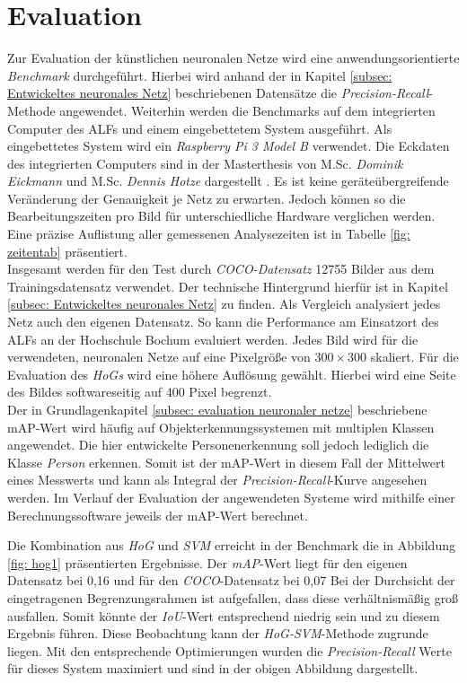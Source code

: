 \chapter{Evaluation}
\label{ch: Verifikation}
Zur Evaluation der künstlichen neuronalen Netze wird eine anwendungsorientierte \textit{Benchmark} durchgeführt. Hierbei wird anhand der in Kapitel \ref{subsec: Entwickeltes neuronales Netz} beschriebenen Datensätze die \textit{Precision-Recall}-Methode angewendet. Weiterhin werden die Benchmarks auf dem integrierten Computer des ALFs und einem eingebettetem System ausgeführt. Als eingebettetes System wird ein \textit{Raspberry Pi 3 Model B} verwendet. Die Eckdaten des integrierten Computers sind in der Masterthesis von M.Sc. \textit{Dominik Eickmann} und M.Sc. \textit{Dennis Hotze} dargestellt \cite{alf}. Es ist keine geräteübergreifende Veränderung der Genauigkeit je Netz zu erwarten. Jedoch können so die Bearbeitungszeiten pro Bild für unterschiedliche Hardware verglichen werden. Eine präzise Auflistung aller gemessenen Analysezeiten ist in Tabelle \ref{fig: zeitentab} präsentiert. \\

Insgesamt werden für den Test durch \textit{COCO-Datensatz} 12755 Bilder aus dem Trainingsdatensatz verwendet. Der technische Hintergrund hierfür ist in Kapitel \ref{subsec: Entwickeltes neuronales Netz} zu finden. Als Vergleich analysiert jedes Netz auch den eigenen Datensatz. So kann die Performance am Einsatzort des ALFs an der Hochschule Bochum evaluiert werden. Jedes Bild wird für die verwendeten, neuronalen Netze auf eine Pixelgröße von $300 \times 300$ skaliert. Für die Evaluation des \textit{HoGs} wird eine höhere Auflösung gewählt. Hierbei wird eine Seite des Bildes softwareseitig auf 400 Pixel begrenzt. \\

Der in Grundlagenkapitel \ref{subsec: evaluation neuronaler netze} beschriebene mAP-Wert wird häufig auf Objekterkennungssystemen mit multiplen Klassen angewendet. Die hier entwickelte Personenerkennung soll jedoch lediglich die Klasse \textit{Person} erkennen. Somit ist der mAP-Wert in diesem Fall der Mittelwert eines Messwerts und kann als Integral der \textit{Precision-Recall}-Kurve angesehen werden. Im Verlauf der Evaluation der angewendeten Systeme wird mithilfe einer Berechnungssoftware jeweils der mAP-Wert berechnet.
 


Die Kombination aus \textit{HoG} und \textit{SVM} erreicht in der Benchmark die in Abbildung \ref{fig: hog1} präsentierten Ergebnisse. Der \textit{mAP}-Wert liegt für den eigenen Datensatz bei 0,16 und für den \textit{COCO}-Datensatz bei 0,07 Bei der Durchsicht der eingetragenen Begrenzungsrahmen ist aufgefallen, dass diese verhältnismäßig groß ausfallen. Somit könnte der \textit{IoU}-Wert entsprechend niedrig sein und zu diesem Ergebnis führen. Diese Beobachtung kann der \textit{HoG-SVM}-Methode zugrunde liegen. Mit den entsprechende Optimierungen wurden die \textit{Precision-Recall} Werte für dieses System maximiert und sind in der obigen Abbildung dargestellt.


